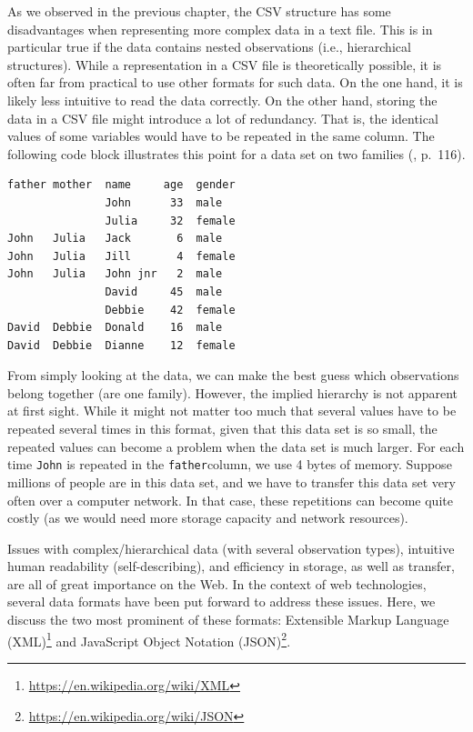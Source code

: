 \documentclass[
  12pt,
]{style/krantz}
\renewcommand{\href}[2]{#2\footnote{\url{#1}}}
\begin{document}
As we observed in the previous chapter, the CSV structure has some disadvantages when representing more complex data in a text file. This is in particular true if the data contains nested observations (i.e., hierarchical structures). While a representation in a CSV file is theoretically possible, it is often far from practical to use other formats for such data. On the one hand, it is likely less intuitive to read the data correctly. On the other hand, storing the data in a CSV file might introduce a lot of redundancy. That is, the identical values of some variables would have to be repeated in the same column. The following code block illustrates this point for a data set on two families (\citep{murrell_2009}, p.~116).

\begin{verbatim}
father mother  name     age  gender
               John      33  male
               Julia     32  female
John   Julia   Jack       6  male
John   Julia   Jill       4  female
John   Julia   John jnr   2  male
               David     45  male
               Debbie    42  female
David  Debbie  Donald    16  male
David  Debbie  Dianne    12  female
\end{verbatim}

From simply looking at the data, we can make the best guess which observations belong together (are one family). However, the implied hierarchy is not apparent at first sight. While it might not matter too much that several values have to be repeated several times in this format, given that this data set is so small, the repeated values can become a problem when the data set is much larger. For each time \texttt{John} is repeated in the \texttt{father}column, we use 4 bytes of memory. Suppose millions of people are in this data set, and we have to transfer this data set very often over a computer network. In that case, these repetitions can become quite costly (as we would need more storage capacity and network resources).

Issues with complex/hierarchical data (with several observation types), intuitive human readability (self-describing), and efficiency in storage, as well as transfer, are all of great importance on the Web. In the context of web technologies, several data formats have been put forward to address these issues. Here, we discuss the two most prominent of these formats: \href{https://en.wikipedia.org/wiki/XML}{Extensible Markup Language (XML)} and \href{https://en.wikipedia.org/wiki/JSON}{JavaScript Object Notation (JSON)}.
\end{document}
